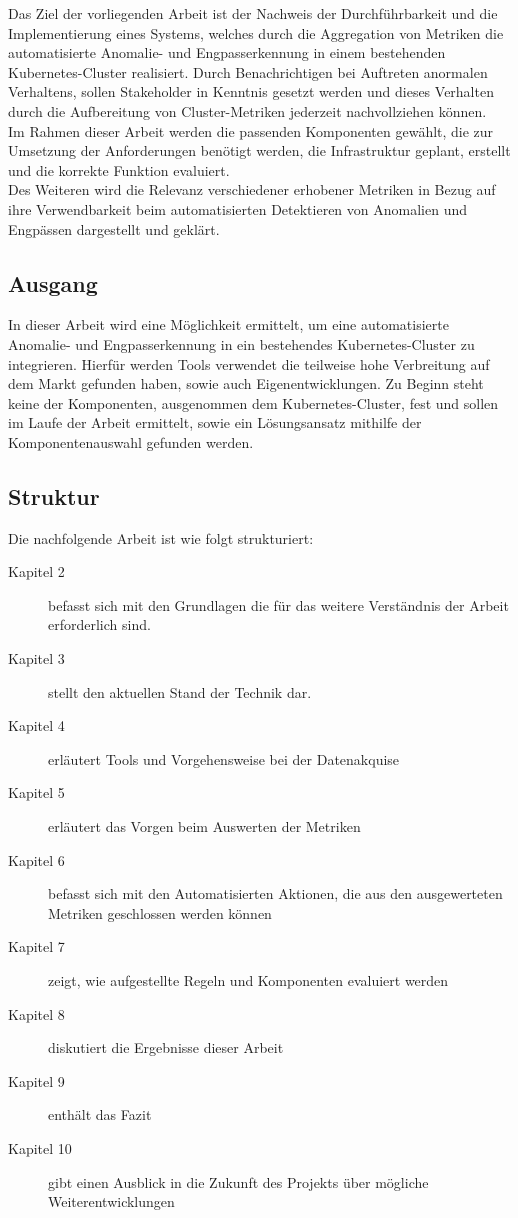 \documentclass[a4paper,12pt]{scrartcl}
\begin{document}
Das Ziel der vorliegenden Arbeit ist der Nachweis der Durchführbarkeit und die Implementierung eines Systems, welches durch die Aggregation von Metriken die automatisierte Anomalie- und Engpasserkennung in einem bestehenden Kubernetes-Cluster realisiert. Durch Benachrichtigen bei Auftreten anormalen Verhaltens, sollen Stakeholder in Kenntnis gesetzt werden und dieses Verhalten durch die Aufbereitung von Cluster-Metriken jederzeit nachvollziehen können.\\
Im Rahmen dieser Arbeit werden die passenden Komponenten gewählt, die zur Umsetzung der Anforderungen benötigt werden, die Infrastruktur geplant, erstellt und die korrekte Funktion evaluiert.\\
Des Weiteren wird die Relevanz verschiedener erhobener Metriken in Bezug auf ihre Verwendbarkeit beim automatisierten Detektieren von Anomalien und Engpässen dargestellt und geklärt.

\subsection{Ausgang}

In dieser Arbeit wird eine Möglichkeit ermittelt, um eine automatisierte Anomalie- und Engpasserkennung in ein bestehendes Kubernetes-Cluster zu integrieren. Hierfür werden Tools verwendet die teilweise hohe Verbreitung auf dem Markt gefunden haben, sowie auch Eigenentwicklungen. Zu Beginn steht keine der Komponenten, ausgenommen dem Kubernetes-Cluster, fest und sollen im Laufe der Arbeit ermittelt, sowie ein Lösungsansatz mithilfe der Komponentenauswahl gefunden werden.

\subsection{Struktur}

Die nachfolgende Arbeit ist wie folgt strukturiert:\\

\begin{description}

\item [Kapitel 2] befasst sich mit den Grundlagen die für das weitere Verständnis der Arbeit erforderlich sind.
\item [Kapitel 3] stellt den aktuellen Stand der Technik dar.
\item [Kapitel 4] erläutert Tools und Vorgehensweise bei der Datenakquise
\item [Kapitel 5] erläutert das Vorgen beim Auswerten der Metriken
\item [Kapitel 6] befasst sich mit den Automatisierten Aktionen, die aus den ausgewerteten Metriken geschlossen werden können
\item [Kapitel 7] zeigt, wie aufgestellte Regeln und Komponenten evaluiert werden
\item [Kapitel 8] diskutiert die Ergebnisse dieser Arbeit
\item [Kapitel 9] enthält das Fazit
\item [Kapitel 10] gibt einen Ausblick in die Zukunft des Projekts über mögliche Weiterentwicklungen
\end{description}
\end{document}
